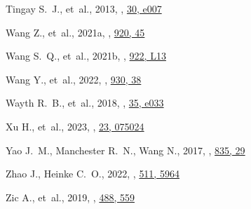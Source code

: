 \documentclass[fleqn,usenatbib]{mnras}
\begin{document}
\begin{thebibliography}{99}
{Tingay} S.~J.,  et~al., 2013, , \href {https://ui.adsabs.harvard.edu/abs/2013PASA...30....7T} {30, e007}

{Wang} Z.,  et~al., 2021a, , \href {https://ui.adsabs.harvard.edu/abs/2021ApJ...920...45W} {920, 45}

{Wang} S.~Q.,  et~al., 2021b, , \href {https://ui.adsabs.harvard.edu/abs/2021ApJ...922L..13W} {922, L13}

{Wang} Y.,  et~al., 2022, , \href {https://ui.adsabs.harvard.edu/abs/2022ApJ...930...38W} {930, 38}

{Wayth} R.~B.,  et~al., 2018, , \href {https://ui.adsabs.harvard.edu/abs/2018PASA...35...33W} {35, e033}

{Xu} H.,  et~al., 2023, , \href {https://ui.adsabs.harvard.edu/abs/2023RAA....23g5024X} {23, 075024}

{Yao} J.~M.,  {Manchester} R.~N.,   {Wang} N.,  2017, , \href {https://ui.adsabs.harvard.edu/abs/2017ApJ...835...29Y} {835, 29}

{Zhao} J.,  {Heinke} C.~O.,  2022, , \href {https://ui.adsabs.harvard.edu/abs/2022MNRAS.511.5964Z} {511, 5964}

{Zic} A.,  et~al., 2019, , \href {https://ui.adsabs.harvard.edu/abs/2019MNRAS.488..559Z} {488, 559}
\end{thebibliography}
\end{document}

